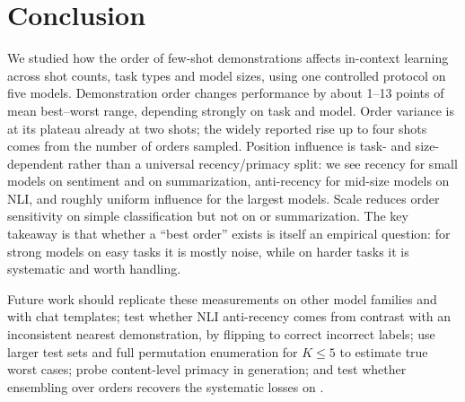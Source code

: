 \section{Conclusion}
\label{sec:conclusion}

We studied how the order of few-shot demonstrations affects in-context learning across shot counts, task types and model sizes, using one controlled protocol on five \qwen models.
Demonstration order changes performance by about 1--13 points of mean best--worst range, depending strongly on task and model.
Order variance is at its plateau already at two shots; the widely reported rise up to four shots comes from the number of orders sampled.
Position influence is task- and size-dependent rather than a universal recency/primacy split: we see recency for small models on sentiment and on summarization, anti-recency for mid-size models on NLI, and roughly uniform influence for the largest models.
Scale reduces order sensitivity on simple classification but not on \mnli or summarization.
The key takeaway is that whether a ``best order'' exists is itself an empirical question: for strong models on easy tasks it is mostly noise, while on harder tasks it is systematic and worth handling.

Future work should replicate these measurements on other model families and with chat templates; test whether NLI anti-recency comes from contrast with an inconsistent nearest demonstration, by flipping to correct \vsx incorrect labels; use larger test sets and full permutation enumeration for $K\leq5$ to estimate true worst cases; probe content-level primacy in generation; and test whether ensembling over orders recovers the systematic losses on \mnli.
